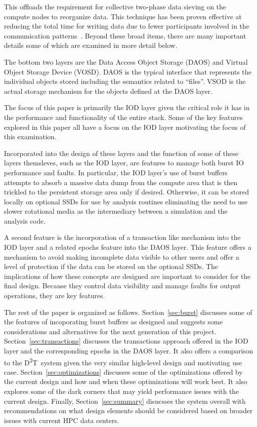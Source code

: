 \documentclass[conference]{sig-alt-gov2}
\newcommand{\DDT}{D\textsuperscript{2}T~}
\begin{document}
This offloads the requirement for collective two-phase data sieving
on the compute nodes to reorganize data. This technique has been proven
effective at reducing the total time for writing data due to fewer participants
involved in the communication patterns~\cite{lofstead:2011:nessie-staging}.
Beyond these broad items, there are many important details some of which are
examined in more detail below.

The bottom two layers are the Data Access Object Storage (DAOS) and Virtual
Object Storage Device (VOSD). DAOS is the typical interface that represents
the individual objects stored including the semantics related to ``files''.
VSOD is the actual storage mechanism for the objects defined at the DAOS layer.

The focus of this paper is primarily the IOD layer given the critical role it
has in the performance and functionality of the entire stack. Some of the key
features explored in this paper all have a focus on the IOD layer motivating
the focus of this examination.

Incorporated into the design of these layers and the function of some of these
layers themsleves, such as the IOD layer, are features to manage both burst IO
performance and faults. In particular, the IOD layer's use of burst buffers
attempts to absorb a massive data dump from the compute area that is then
trickled to the persistent storage area only if desired. Otherwise, it can be
stored locally on optional SSDs for use by analysis routines eliminating the
need to use slower rotational media as the intermediary between a simulation
and the analysis code.

A second feature is the incorporation of a transaction like mechanism into the
IOD layer and a related epochs feature into the DAOS layer. This feature offers
a mechanism to avoid making incomplete data visible to other users and offer a
level of protection if the data can be stored on the optional SSDs. The
implications of how these concepts are designed are important to consider for
the final design. Because they control data visibility and manage faults for
output operations, they are key features.

The rest of the paper is organized as follows. Section~\ref{sec:burst}
discusses some of the features of incoporating burst buffers as designed and
suggests some considerations and alternatives for the next generation of this
project. Section~\ref{sec:transactions} discusses the transactions approach
offered in the IOD layer and the corresponding epochs in the DAOS layer. It
also offers a comparison to the \DDT system given the very similar high-level
design and motivating use case.  Section~\ref{sec:optimizations} discusses some
of the optimizations offered by the current design and how and when these
optimizations will work best. It also explores some of the dark corners that
may yield performance issues with the current design. Finally,
Section~\ref{sec:summary} disucsses the system overall with recommendations on
what design elements should be considered based on broader issues with current
HPC data centers.
\end{document}
